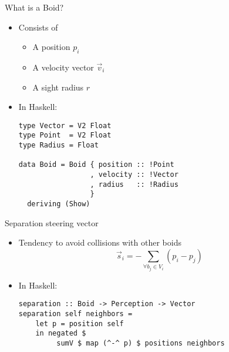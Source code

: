 \documentclass{beamer}
\begin{document}
\begin{frame}[fragile]
    \huge{What is a Boid?}\normalsize
    \begin{itemize}
        \item Consists of
        \begin{itemize}
            \item A position $p_i$
            \item A velocity vector $\vec{v}_i$
            \item A sight radius $r$
        \end{itemize}
        \item In Haskell:
        \begin{verbatim}
type Vector = V2 Float
type Point  = V2 Float
type Radius = Float

data Boid = Boid { position :: !Point
                 , velocity :: !Vector
                 , radius   :: !Radius
                 }
  deriving (Show)
        \end{verbatim}
    \end{itemize}
\end{frame}

\begin{frame}[fragile]
    \huge{Separation steering vector}\normalsize
    \begin{itemize}

    \item Tendency to avoid collisions with other boids
        \begin{equation*}
    \vec{s}_i = - \sum\limits_{\forall b_j \in V_i} (p_i - p_j)
    \end{equation*}
    \item In Haskell:
    \begin{verbatim}
separation :: Boid -> Perception -> Vector
separation self neighbors =
    let p = position self
    in negated $
         sumV $ map (^-^ p) $ positions neighbors
\end{verbatim}
    \end{itemize}


\end{frame}
\end{document}

